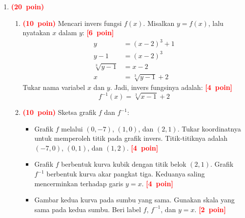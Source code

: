 \documentclass[12pt,a4paper]{article}
\newcommand{\bobot}[1]{\mbox{\textcolor{red}{\textbf{(#1 poin)}}}}
\newcommand{\poin}[1]{\mbox{\textcolor{red}{\textbf{[#1 poin]}}}}
\begin{document}
\begin{enumerate}
  \item \bobot{20}
        \begin{enumerate}[label=\alph*.]
          \item \bobot{10} Mencari invers fungsi $f(x)$.
                Misalkan $y = f(x)$, lalu nyatakan $x$ dalam $y$: \poin{6}
                \begin{align*}
                  y               & = (x - 2)^3 + 1       \\
                  y - 1           & = (x - 2)^3           \\
                  \sqrt[3]{y - 1} & = x - 2               \\
                  x               & = \sqrt[3]{y - 1} + 2
                \end{align*}
                Tukar nama variabel $x$ dan $y$. Jadi, invers fungsinya adalah: \poin{4}
                \[ f^{-1}(x) = \sqrt[3]{x - 1} + 2 \]

          \item \bobot{10} Sketsa grafik $f$ dan $f^{-1}$:
                \begin{samepage}
                  \begin{itemize}[nosep]
                    \item Grafik $f$ melalui $(0,-7)$, $(1,0)$, dan $(2,1)$.
                          Tukar koordinatnya untuk memperoleh titik pada grafik invers.
                          Titik-titiknya adalah $(-7,0)$, $(0,1)$, dan $(1,2)$. \poin{4}
                    \item Grafik $f$ berbentuk kurva kubik dengan titik belok $(2,1)$.
                          Grafik $f^{-1}$ berbentuk kurva akar pangkat tiga.
                          Keduanya saling mencerminkan terhadap garis $y=x$. \poin{4}
                    \item Gambar kedua kurva pada sumbu yang sama.
                          Gunakan skala yang sama pada kedua sumbu.
                          Beri label $f$, $f^{-1}$, dan $y=x$. \poin{2}
                  \end{itemize}
                \end{samepage}

                \begin{center}
\end{center}
\end{enumerate}
\end{enumerate}
\end{document}

